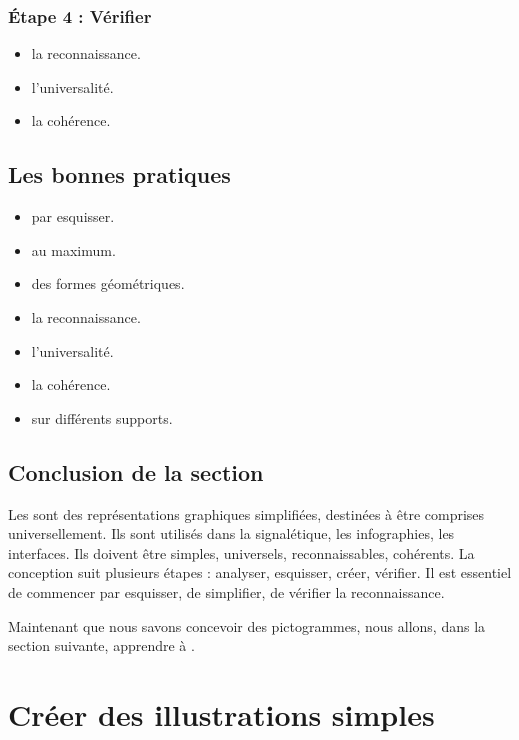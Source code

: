 \subsubsection{Étape 4 : Vérifier}

\begin{itemize}
    \item {} la reconnaissance.
    \item {} l'universalité.
    \item {} la cohérence.
\end{itemize}

\subsection{Les bonnes pratiques}

\begin{itemize}
    \item {} par esquisser.
    \item {} au maximum.
    \item {} des formes géométriques.
    \item {} la reconnaissance.
    \item {} l'universalité.
    \item {} la cohérence.
    \item {} sur différents supports.
\end{itemize}

\subsection*{Conclusion de la section}

Les  sont des représentations graphiques simplifiées, destinées à être comprises universellement. Ils sont utilisés dans la signalétique, les infographies, les interfaces. Ils doivent être simples, universels, reconnaissables, cohérents. La conception suit plusieurs étapes : analyser, esquisser, créer, vérifier. Il est essentiel de commencer par esquisser, de simplifier, de vérifier la reconnaissance.

Maintenant que nous savons concevoir des pictogrammes, nous allons, dans la section suivante, apprendre à .

\section{Créer des illustrations simples}

